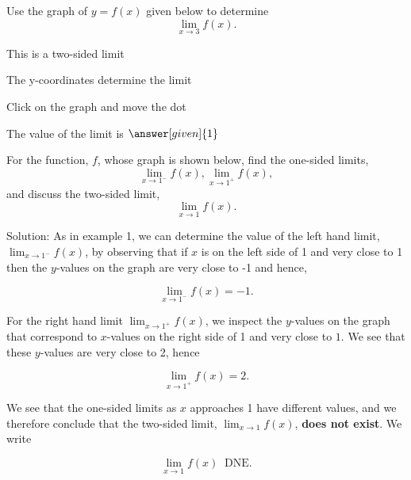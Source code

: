 \documentclass{ximera}
\begin{document}
\begin{problem} %




Use the graph of $y = f(x)$ given below to determine
  \[
  \lim_{x\to 3} f(x).
  \]
  
    \begin{hint}
      This is a two-sided limit
    \end{hint}
    \begin{hint}
      The y-coordinates determine the limit
    \end{hint}
		\begin{hint}
		  Click on the graph and move the dot
		\end{hint}
		The value of the limit is
		 $\answer[given]{1}$

	
\end{problem}

\begin{example} %
For the function, $f$, whose graph is shown below, find the one-sided limits,
\[\lim_{x \to 1^-}f(x), \lim_{x \to 1^+}f(x),
\] 
and discuss the two-sided limit, 
\[\lim_{x \to 1} f(x).
\]





\vspace{.25in}
Solution: As in example 1, we can determine the value of the left hand limit, $\lim_{x \to 1^-}f(x)$, 
by observing that if $x$ is on the left side of 1 and very close to 1 then the $y$-values on the 
graph are very close to -1 and hence, 

\[
\lim_{x \to 1^-}f(x) = -1.
\]

For the right hand limit $\lim_{x \to 1^+}f(x)$, we inspect the $y$-values on the 
graph that correspond to $x$-values on the right side of 1 and very close to $1$.  
We see that these $y$-values are very close to 2, hence

\[
\lim_{x \to 1^+}f(x) = 2.
\]

We see that the one-sided limits as $x$ approaches 1 have different values, and we therefore 
conclude that the two-sided limit, $\lim_{x \to 1}f(x)$, \textbf{does not exist}.  We write

\[
\lim_{x \to 1}f(x) \;\;\text{DNE}.
\]

\end{example}
\end{document}
